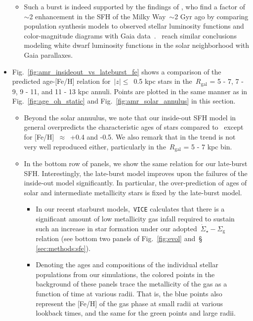 \documentclass[fleqn, usenatbib]{mnras}
\begin{document}
\begin{itemize}
\begin{itemize}
		\item Such a burst is indeed supported by the findings of 
		\citet{Mor2019}, who find a factor of~$\sim$2 enhancement in the SFH 
		of the Milky Way~$\sim$2 Gyr ago by comparing population synthesis 
		models to observed stellar luminosity functions and color-magnitude 
		diagrams with Gaia data~\citep{GaiaDR2}.~\citet{Isern2019} reach 
		similar conclusions modeling white dwarf luminosity functions in the 
		solar neighborhood with Gaia parallaxes. 
	\end{itemize} 

	\item Fig.~\ref{fig:amr_insideout_vs_lateburst_fe} shows a comparison of 
	the predicted age-[Fe/H] relation for~$\left|z\right|\leq$~0.5 kpc stars 
	in the~$R_\text{gal}$ = 5 - 7, 7 - 9, 9 - 11, and 11 - 13 kpc annuli. 
	Points are plotted in the same manner as in Fig.~\ref{fig:age_oh_static} 
	and Fig.~\ref{fig:amr_solar_annulus} in this section. 
	\begin{itemize} 
		\item Beyond the solar annuulus, we note that our inside-out SFH 
		model in general overpredicts the characteristic ages of stars 
		compared to~\citet{Feuillet2019} except for [Fe/H]~$\approx$~+0.4 and 
		-0.5. We also remark that in the trend is not very well reproduced 
		either, particularly in the~$R_\text{gal}$ = 5 - 7 kpc bin. 

		\item In the bottom row of panels, we show the same relation for our 
		late-burst SFH. Interestingly, the late-burst model improves upon the 
		failures of the inside-out model significantly. In particular, the 
		over-prediction of ages of solar and intermediate metallicity stars is 
		fixed by the late-burst model. 
		\begin{itemize} 
			\item In our recent starburst models,~\texttt{VICE} calculates 
			that there is a significant amount of low metallicity gas infall 
			required to sustain such an increase in star formation under our 
			adopted~$\dot{\Sigma}_\star-\Sigma_\text{g}$ relation (see 
			bottom two panels of Fig.~\ref{fig:evol} and~\S~
			\ref{sec:methods:sfe}). 

			\item Denoting the ages and compositions of the individual stellar 
			populations from our simulations, the colored points in the 
			background of these panels trace the metallicity of the gas as a 
			function of time at various radii. That is, the blue points also 
			represent the [Fe/H] of the gas phase at small radii at various 
			lookback times, and the same for the green points and large radii. 


\end{itemize}
\end{itemize}
\end{itemize}
\end{document}
